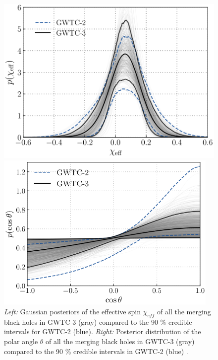 \documentclass[a4paper,titlepage]{book}     	%
\begin{document}
\begin{figure}[h!]
	\begin{minipage}{.49\textwidth}
		\centering
		\includegraphics[width=\textwidth]{./images/spineff.png}
	\end{minipage}
	\hfill
	\begin{minipage}{.49\textwidth}
		\vspace{-1mm}
		\centering
		\includegraphics[width=0.96\textwidth]{./images/spinorientation.png}	
	\end{minipage}
	\caption{\emph{Left:} Gaussian posteriors of the effective spin $\chi_{eff}$ of all the merging black holes in GWTC-3 (gray) compared to the 90 \% credible intervals for GWTC-2 (blue). \emph{Right:} Posterior distribution of the polar angle $\theta$ of all the merging black holes in GWTC-3 (gray) compared to the 90 \% credible intervals in GWTC-2 (blue) \cite{GWTC-3_interpretation}.} \label{fig:spineffective}
\end{figure}
\end{document}
